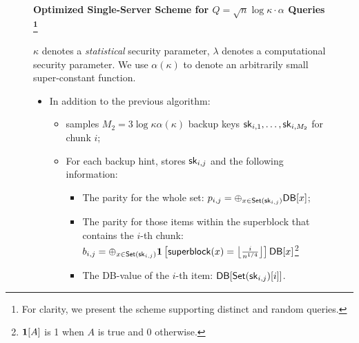 \begin{figure}[p]
    
    \begin{minipage}{\textwidth}
        \begin{mdframed}
            \label{alg:optimized:full}
            \begin{center}
                {\bf Optimized Single-Server Scheme for $Q=\sqrt{n}\log \kappa \cdot \alpha$ Queries
                    \footnote{For clarity, we present the scheme supporting distinct and random queries.}
                }
            \end{center}
            $\kappa$ denotes a {\it statistical} security parameter, $\lambda$
            denotes a computational security parameter. We use $\alpha(\kappa)$
            to denote an arbitrarily small super-constant function.
            
            
            \begin{itemize}[leftmargin=3mm,itemsep=1pt]
                \item In addition to the previous algorithm:
                \begin{itemize}
                    \item \Client samples $M_2=3\log \kappa \alpha(\kappa)$
                    backup keys $\mathsf{sk}_{i,1},\dots,\mathsf{sk}_{i,M_2}$ for chunk $i$;
                    \item For each backup hint, \Client stores $\mathsf{sk}_{i, j}$ and
                    the following information:
                    \begin{itemize}
                        \item The parity for the whole set: $p_{i,j}=\oplus_{x\in
                        \mathsf{Set}(\mathsf{sk}_{i,j})} \mathsf{DB}[x]$;
                        \item The parity for those items within the superblock
                        that contains the $i$-th chunk: $b_{i,j}=\oplus_{x\in
                        \mathsf{Set}(\mathsf{sk}_{i,j})} \mathbf{1}\left[\mathsf{superblock}(x) = \left\lfloor
                        \frac{i}{n^{1/4}} \right\rfloor
                        \right]\mathsf{DB}[x]$\footnote{$\mathbf{1}[A]$ is 1 when $A$ is true
                        and 0 otherwise.}
                       
                        \item The DB-value of the $i$-th item:
                        $\mathsf{DB}[\mathsf{Set}(\mathsf{sk}_{i,j})[i]]$. 
                    \end{itemize}
                \end{itemize}  
                

\end{itemize}
\end{mdframed}
\end{minipage}
\end{figure}
